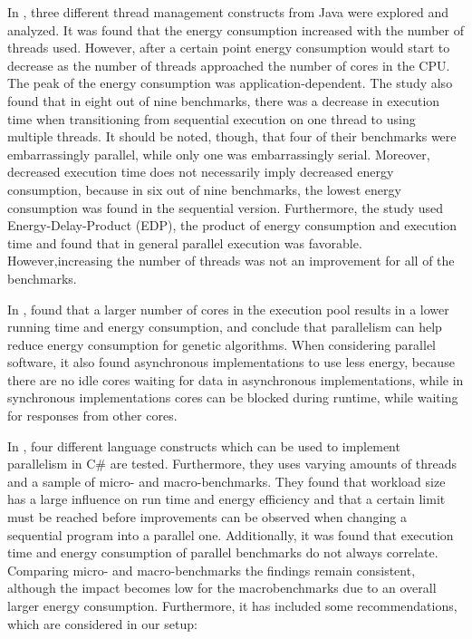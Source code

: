 In \cite{Pinto2014}, three different thread management constructs from Java were explored and analyzed. It was found that the energy consumption increased with the number of threads used. However, after a certain point energy consumption would start to decrease as the number of threads approached the number of cores in the CPU. The peak of the energy consumption was application-dependent. The study also found that in eight out of nine benchmarks, there was a decrease in execution time when transitioning from sequential execution on one thread to using multiple threads. It should be noted, though, that four of their benchmarks were embarrassingly parallel, while only one was embarrassingly serial. Moreover, decreased execution time does not necessarily imply decreased energy consumption, because in six out of nine benchmarks, the lowest energy consumption was found in the sequential version. Furthermore, the study used Energy-Delay-Product (EDP), the product of energy consumption and execution time and found that in general parallel execution was favorable. However,increasing the number of threads was not an improvement for all of the benchmarks.\cite{Pinto2014}

In \cite{abdelhafez2019}, found that a larger number of cores in the execution pool results in a lower running time and energy consumption, and conclude that parallelism can help reduce energy consumption for genetic algorithms. %
When considering parallel software, it also found asynchronous implementations to use less energy, because there are no idle cores waiting for data in asynchronous implementations, while in synchronous implementations cores can be blocked during runtime, while waiting for responses from other cores.

In \cite{Lindholt2022}, %
four different language constructs which can be used to implement parallelism in C\# are tested. Furthermore, they uses varying amounts of threads and a sample of micro- and macro-benchmarks. They found that workload size has a large influence on run time and energy efficiency and that a certain limit must be reached before improvements can be observed when changing a sequential program into a parallel one. Additionally, it was found that execution time and energy consumption of parallel benchmarks do not always correlate. Comparing micro- and macro-benchmarks the findings remain consistent, although the impact becomes low for the macrobenchmarks due to an overall larger energy consumption. Furthermore, it has included some recommendations, which are considered in our setup:\cite{Lindholt2022}


